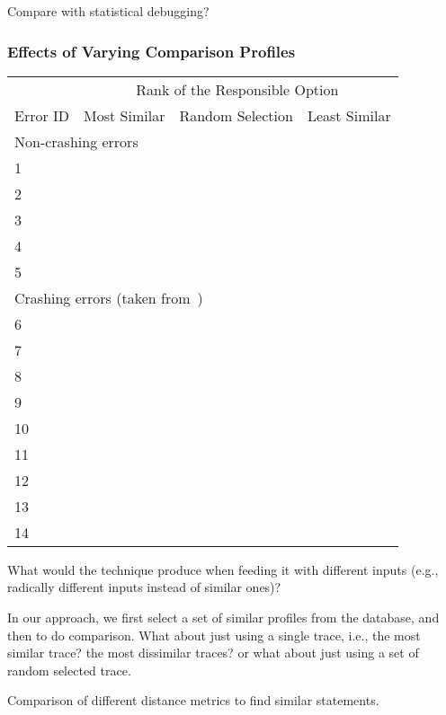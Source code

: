 Compare with statistical debugging?

\subsubsection{Effects of Varying Comparison Profiles}


\begin{table}[t]
\setlength{\tabcolsep}{.54\tabcolsep}
\begin{tabular}{|l|l|l|l|}
\hline
  & \multicolumn{3}{|c|}{Rank of the Responsible Option } \\
\cline{2-4}
 Error ID & Most Similar& Random Selection& Least Similar\\
 \hline
\hline
\multicolumn{4}{|l|}{Non-crashing errors}   \\
 \hline
 1 & & &\\
 2 & & &\\
 3 & & &\\
 4 & & &\\
 5 & & &\\
\hline
\hline
\multicolumn{4}{|l|}{Crashing errors (taken from~\cite{})}   \\
\hline
 6 & & &\\
 7 & & &\\
 8 & & &\\
 9 & & &\\
 10 & & &\\
 11 & & &\\
 12 & & &\\
 13 & & &\\
 14 & & &\\
\hline
\end{tabular}

\end{table}



What would the technique produce when feeding it with different inputs (e.g.,
radically different inputs instead of similar ones)?

In our approach, we first select a set of similar profiles from the  database,
and then to do comparison. What about just using a single trace, i.e., the
most similar trace? the most dissimilar traces? or what about just using a set
of random selected trace.

Comparison of different distance metrics to find similar statements.

